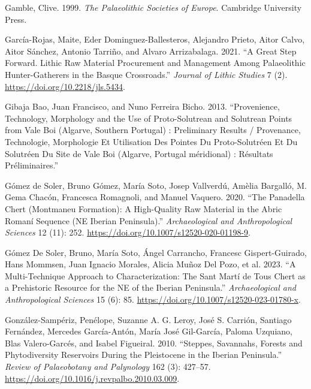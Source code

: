 \documentclass[
  a4paper,
  DIV=11,
  numbers=noendperiod]{scrreprt}
\newlength{\cslhangindent}
\newenvironment{CSLReferences}[2] %
 {\begin{list}{}{%
  \setlength{\itemindent}{0pt}
  \setlength{\leftmargin}{0pt}
  \setlength{\parsep}{0pt}
  \ifodd #1
   \setlength{\leftmargin}{\cslhangindent}
   \setlength{\itemindent}{-1\cslhangindent}
  \fi
  \setlength{\itemsep}{#2\baselineskip}}}
 {\end{list}}
\begin{document}
\begin{CSLReferences}{1}{0}
Gamble, Clive. 1999. \emph{The {Palaeolithic Societies} of {Europe}}.
Cambridge University Press.

García-Rojas, Maite, Eder Dominguez-Ballesteros, Alejandro Prieto, Aitor
Calvo, Aitor Sánchez, Antonio Tarriño, and Alvaro Arrizabalaga. 2021.
{``A {Great Step Forward}. {Lithic Raw Material Procurement} and
{Management} Among {Palaeolithic Hunter-Gatherers} in the {Basque
Crossroads}.''} \emph{Journal of Lithic Studies} 7 (2).
\url{https://doi.org/10.2218/jls.5434}.

Gibaja Bao, Juan Francisco, and Nuno Ferreira Bicho. 2013.
{``Provenience, Technology, Morphology and the Use of Proto-Solutrean
and Solutrean Points from {Vale Boi} ({Algarve}, Southern Portugal) :
Preliminary Results / {Provenance}, Technologie, Morphologie Et
Utilisation Des Pointes Du Proto-Solutr{é}en Et Du Solutr{é}en Du Site
de {Vale Boi} ({Algarve}, {Portugal} m{é}ridional) : R{é}sultats
Pr{é}liminaires.''}

Gómez de Soler, Bruno Gómez, María Soto, Josep Vallverdú, Amèlia
Bargalló, M. Gema Chacón, Francesca Romagnoli, and Manuel Vaquero. 2020.
{``The {Panadella} Chert ({Montmaneu Formation}): A High-Quality Raw
Material in the {Abric Roman{í}} Sequence ({NE Iberian Peninsula}).''}
\emph{Archaeological and Anthropological Sciences} 12 (11): 252.
\url{https://doi.org/10.1007/s12520-020-01198-9}.

Gómez De Soler, Bruno, María Soto, Ángel Carrancho, Francesc
Gispert-Guirado, Hans Mommsen, Juan Ignacio Morales, Alicia Muñoz Del
Pozo, et al. 2023. {``A Multi-Technique Approach to Characterization:
The {Sant Mart{í}} de {Tous} Chert as a Prehistoric Resource for the
{NE} of the {Iberian Peninsula}.''} \emph{Archaeological and
Anthropological Sciences} 15 (6): 85.
\url{https://doi.org/10.1007/s12520-023-01780-x}.

González-Sampériz, Penélope, Suzanne A. G. Leroy, José S. Carrión,
Santiago Fernández, Mercedes García-Antón, María José Gil-García, Paloma
Uzquiano, Blas Valero-Garcés, and Isabel Figueiral. 2010. {``Steppes,
Savannahs, Forests and Phytodiversity Reservoirs During the
{Pleistocene} in the {Iberian Peninsula}.''} \emph{Review of
Palaeobotany and Palynology} 162 (3): 427--57.
\url{https://doi.org/10.1016/j.revpalbo.2010.03.009}.


\end{CSLReferences}
\end{document}
